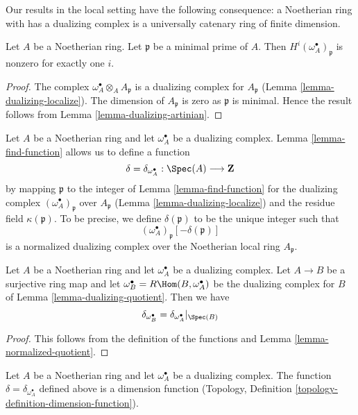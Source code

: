 \noindent
Our results in the local setting have the following consequence:
a Noetherian ring with has a dualizing complex is a
universally catenary ring of finite dimension.

\begin{lemma}
\label{lemma-nonvanishing-generically}
Let $A$ be a Noetherian ring. Let $\mathfrak p$ be a minimal prime
of $A$. Then $H^i(\omega_A^\bullet)_\mathfrak p$ is nonzero
for exactly one $i$.
\end{lemma}

\begin{proof}
The complex $\omega_A^\bullet \otimes_A A_\mathfrak p$
is a dualizing complex for $A_\mathfrak p$
(Lemma \ref{lemma-dualizing-localize}).
The dimension of $A_\mathfrak p$ is zero as $\mathfrak p$
is minimal. Hence the result follows from
Lemma \ref{lemma-dualizing-artinian}.
\end{proof}

\noindent
Let $A$ be a Noetherian ring and let $\omega_A^\bullet$ be a dualizing
complex. Lemma \ref{lemma-find-function} allows us to define a function
$$
\delta = \delta_{\omega_A^\bullet} : \Spec(A) \longrightarrow \mathbf{Z}
$$
by mapping $\mathfrak p$ to the integer of Lemma \ref{lemma-find-function}
for the dualizing complex $(\omega_A^\bullet)_\mathfrak p$
over $A_\mathfrak p$ (Lemma \ref{lemma-dualizing-localize})
and the residue field $\kappa(\mathfrak p)$. To be precise, we define
$\delta(\mathfrak p)$ to be the unique integer such that
$$
(\omega_A^\bullet)_\mathfrak p[-\delta(\mathfrak p)]
$$
is a normalized dualizing complex over the Noetherian local ring
$A_\mathfrak p$.

\begin{lemma}
\label{lemma-quotient-function}
Let $A$ be a Noetherian ring and let $\omega_A^\bullet$ be a dualizing
complex. Let $A \to B$ be a surjective ring map and let
$\omega_B^\bullet = R\Hom(B, \omega_A^\bullet)$ be the dualizing
complex for $B$ of Lemma \ref{lemma-dualizing-quotient}. Then we have
$$
\delta_{\omega_B^\bullet} = \delta_{\omega_A^\bullet}|_{\Spec(B)}
$$
\end{lemma}

\begin{proof}
This follows from the definition of the functions and
Lemma \ref{lemma-normalized-quotient}.
\end{proof}

\begin{lemma}
\label{lemma-dimension-function}
Let $A$ be a Noetherian ring and let $\omega_A^\bullet$ be a dualizing
complex. The function $\delta = \delta_{\omega_A^\bullet}$
defined above is a dimension function
(Topology, Definition \ref{topology-definition-dimension-function}).
\end{lemma}

